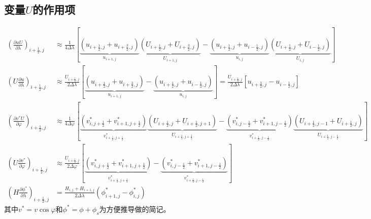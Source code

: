\documentclass{ctexart}
\begin{document}
\subsection{变量$U$的作用项}
\begin{align}
  \left( \frac{\partial u U}{\partial \lambda} \right)_{i+\frac{1}{2},j} & \approx \frac{1}{4 \Delta{\lambda}} \left[ \underbrace{\left( u_{i+\frac{1}{2},j} + u_{i+\frac{3}{2},j} \right)}_{u_{i+1,j}} \underbrace{\left( U_{i+\frac{1}{2},j} + U_{i+\frac{3}{2},j} \right)}_{U_{i+1,j}} - \underbrace{\left( u_{i+\frac{1}{2},j} + u_{i-\frac{1}{2},j} \right)}_{u_{i,j}} \underbrace{\left( U_{i+\frac{1}{2},j} + U_{i-\frac{1}{2},j} \right)}_{U_{i,j}} \right] \nonumber \\
  \left( U \frac{\partial u}{\partial \lambda} \right)_{i+\frac{1}{2},j} & \approx \frac{U_{i+\frac{1}{2},j}}{2 \Delta{\lambda}} \left[ \underbrace{\left( u_{i+\frac{1}{2},j} + u_{i+\frac{3}{2},j} \right)}_{u_{i+1,j}} - \underbrace{\left( u_{i+\frac{1}{2},j} + u_{i-\frac{1}{2},j} \right)}_{u_{i,j}} \right] = \frac{U_{i+\frac{1}{2},j}}{2 \Delta{\lambda}} \left[ u_{i+\frac{3}{2},j} - u_{i-\frac{1}{2},j} \right] \nonumber \\
  \left( \frac{\partial v^* U}{\partial \varphi} \right)_{i+\frac{1}{2},j} & \approx \frac{1}{4 \Delta{\varphi}} \left[ \underbrace{\left( v_{i,j+\frac{1}{2}}^* + v_{i+1,j+\frac{1}{2}}^* \right)}_{v_{i+\frac{1}{2},j+\frac{1}{2}}^*} \underbrace{\left( U_{i+\frac{1}{2},j} + U_{i+\frac{1}{2},j+1} \right)}_{U_{i+\frac{1}{2},j+\frac{1}{2}}} - \underbrace{\left( v_{i,j-\frac{1}{2}}^* + v_{i+1,j-\frac{1}{2}}^* \right)}_{v_{i+\frac{1}{2},j-\frac{1}{2}}^*} \underbrace{\left( U_{i+\frac{1}{2},j-1} + U_{i+\frac{1}{2},j} \right)}_{U_{i+\frac{1}{2},j-\frac{1}{2}}} \right] \nonumber \\
  \left( U \frac{\partial v^*}{\partial \varphi} \right)_{i+\frac{1}{2},j} & \approx \frac{U_{i+\frac{1}{2},j}}{2 \Delta{\varphi}} \left[ \underbrace{\left( v_{i,j+\frac{1}{2}}^* + v_{i+1,j+\frac{1}{2}}^* \right)}_{v_{i+\frac{1}{2},j+\frac{1}{2}}^*} - \underbrace{\left( v_{i,j-\frac{1}{2}}^* + v_{i+1,j-\frac{1}{2}}^* \right)}_{v_{i+\frac{1}{2},j-\frac{1}{2}}^*} \right] \nonumber \\
  \left( H \frac{\partial \phi^*}{\partial \lambda} \right)_{i+\frac{1}{2},j} & = \frac{H_{i,j} + H_{i+1,j}}{2 \Delta{\lambda}} \left( \phi_{i+1,j}^* - \phi_{i,j}^* \right) \nonumber
\end{align}
其中$v^* = v \cos{\varphi}$和$\phi^* = \phi + \phi_s$为方便推导做的简记。
\end{document}

